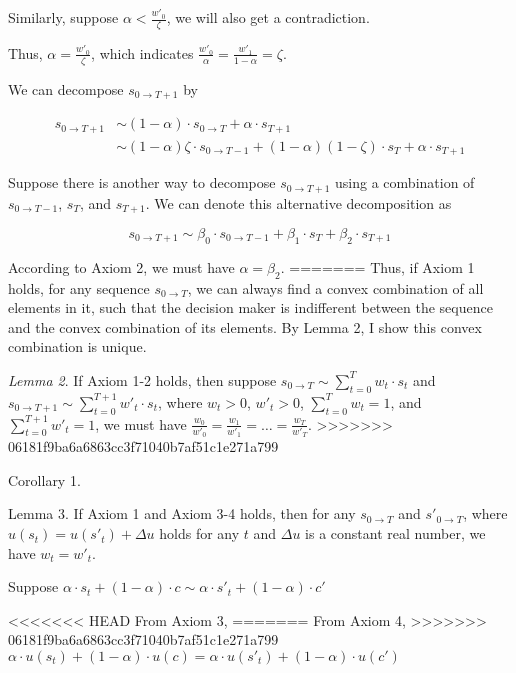 \documentclass[
  12pt,
]{article}
\begin{document}
Similarly, suppose \(\alpha < \frac{w'_0}{\zeta}\), we will also get a
contradiction.

Thus, \(\alpha = \frac{w'_0}{\zeta}\), which indicates
\(\frac{w'_0}{\alpha}=\frac{w'_1}{1-\alpha}=\zeta\).

We can decompose \(s_{0\rightarrow T+1}\) by

\[
\begin{aligned}
s_{0\rightarrow T+1} &\sim (1-\alpha)\cdot s_{0\rightarrow T} + \alpha\cdot s_{T+1} \\
&\sim  (1-\alpha) \zeta\cdot s_{0\rightarrow T-1} + (1-\alpha) (1-\zeta)\cdot s_{T} + \alpha\cdot s_{T+1} 
\end{aligned}
\]

Suppose there is another way to decompose \(s_{0 \rightarrow T+1}\)
using a combination of \(s_{0\rightarrow T-1}\), \(s_{T}\), and
\(s_{T+1}\). We can denote this alternative decomposition as

\[
s_{0\rightarrow T+1} \sim \beta_0\cdot s_{0\rightarrow T-1} + \beta_1\cdot s_T + \beta_2\cdot s_{T+1} 
\]

According to Axiom 2, we must have \(\alpha = \beta_2\).
=======
Thus, if Axiom 1 holds, for any sequence \(s_{0\rightarrow T}\), we can
always find a convex combination of all elements in it, such that the
decision maker is indifferent between the sequence and the convex
combination of its elements. By Lemma 2, I show this convex combination
is unique.

\emph{Lemma 2}. If Axiom 1-2 holds, then suppose
\(s_{0\rightarrow T}\sim \sum_{t=0}^T w_t \cdot s_t\) and
\(s_{0\rightarrow T+1} \sim \sum_{t=0}^{T+1} w'_t\cdot s_t\), where
\(w_t >0\), \(w'_t>0\), \(\sum_{t=0}^Tw_t=1\), and
\(\sum_{t=0}^{T+1}w'_t=1\), we must have
\(\frac{w_0}{w'_0}=\frac{w_1}{w'_1}=…=\frac{w_T}{w'_T}\).
>>>>>>> 06181f9ba6a6863cc3f71040b7af51c1e271a799

Corollary 1.

Lemma 3. If Axiom 1 and Axiom 3-4 holds, then for any
\(s_{0\rightarrow T}\) and \(s'_{0\rightarrow T}\), where
\(u(s_t)= u(s'_t)+\Delta u\) holds for any \(t\) and \(\Delta u\) is a
constant real number, we have \(w_t=w'_t\).

Suppose
\(\alpha \cdot s_t+(1-\alpha)\cdot c\sim\alpha \cdot s'_t+(1-\alpha)\cdot c'\)

<<<<<<< HEAD
From Axiom 3,
=======
From Axiom 4,
>>>>>>> 06181f9ba6a6863cc3f71040b7af51c1e271a799
\(\alpha \cdot u(s_t)+(1-\alpha)\cdot u(c)=\alpha \cdot u(s'_t)+(1-\alpha)\cdot u(c')\)
\end{document}
